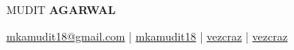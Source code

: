 \documentclass[10pt]{article}
\begin{document}
\begin{center}
    {\Huge MUDIT \textbf{AGARWAL}}\\[0.7ex]
\end{center}

\begin{center}
    \Letter\hspace{0.2ex}
    \href{mailto:mkamudit18@gmail.com}{\small mkamudit18@gmail.com} | 
    \faLinkedinSquare\hspace{0.2ex}     \href{https://www.linkedin.com/in/mkamudit18/}{\small mkamudit18} | 
    \faGithub\hspace{0.2ex} \href{https://github.com/vezcraz/}{\small vezcraz} |
    \faCode\hspace{0.2ex}     \href{https://codeforces.com/profile/vezcraz/}{\small vezcraz} 
\end{center}

\vspace{-3.0ex}
\end{document}

